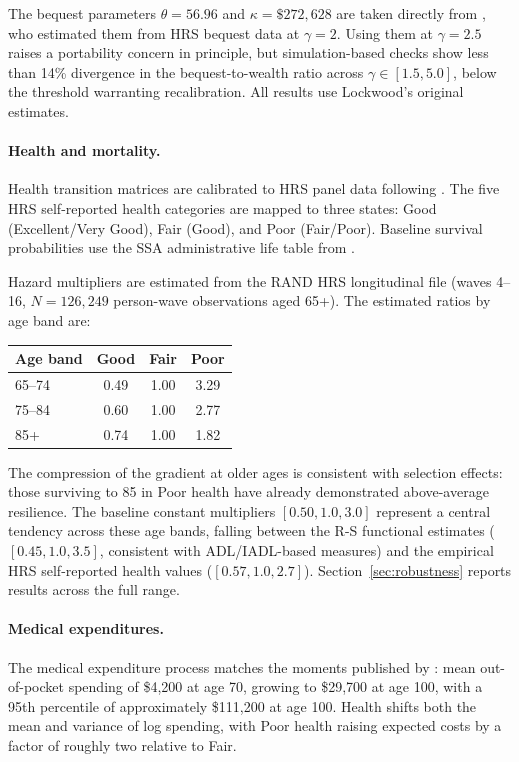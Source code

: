 \documentclass[12pt]{article}
\begin{document}
The bequest parameters $\theta = 56.96$ and $\kappa = \$272{,}628$ are taken directly from \citet{lockwood2012}, who estimated them from HRS bequest data at $\gamma = 2$. Using them at $\gamma = 2.5$ raises a portability concern in principle, but simulation-based checks show less than 14\% divergence in the bequest-to-wealth ratio across $\gamma \in [1.5, 5.0]$, below the threshold warranting recalibration. All results use Lockwood's original estimates.

\paragraph{Health and mortality.} Health transition matrices are calibrated to HRS panel data following \citet{denardi2010}. The five HRS self-reported health categories are mapped to three states: Good (Excellent/Very Good), Fair (Good), and Poor (Fair/Poor). Baseline survival probabilities use the SSA administrative life table from \citet{lockwood2012}.

Hazard multipliers are estimated from the RAND HRS longitudinal file (waves 4--16, $N = 126{,}249$ person-wave observations aged 65+). The estimated ratios by age band are:

\begin{center}
\begin{tabular}{lccc}
\toprule
Age band & Good & Fair & Poor \\
\midrule
65--74 & 0.49 & 1.00 & 3.29 \\
75--84 & 0.60 & 1.00 & 2.77 \\
85+ & 0.74 & 1.00 & 1.82 \\
\bottomrule
\end{tabular}
\end{center}

The compression of the gradient at older ages is consistent with selection effects: those surviving to 85 in Poor health have already demonstrated above-average resilience. The baseline constant multipliers $[0.50, 1.0, 3.0]$ represent a central tendency across these age bands, falling between the R-S functional estimates ($[0.45, 1.0, 3.5]$, consistent with ADL/IADL-based measures) and the empirical HRS self-reported health values ($[0.57, 1.0, 2.7]$). Section~\ref{sec:robustness} reports results across the full range.

\paragraph{Medical expenditures.} The medical expenditure process matches the moments published by \citet{jones2018}: mean out-of-pocket spending of \$4,200 at age 70, growing to \$29,700 at age 100, with a 95th percentile of approximately \$111,200 at age 100. Health shifts both the mean and variance of log spending, with Poor health raising expected costs by a factor of roughly two relative to Fair.
\end{document}
